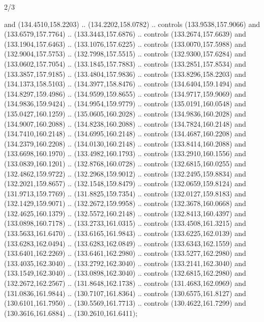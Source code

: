 \begin{flagdescription}{2/3}
\begin{scope}[shift={(0.5\flaglength,0.5)},scale=\flagwidth/320]
\begin{scope}[y=0.8pt, x=0.8pt, yscale=-1,shift={(-118.3,-146)}]
  and (134.4510,158.2203) .. (134.2202,158.0782) .. controls (133.9538,157.9066)
  and (133.6579,157.7764) .. (133.3443,157.6876) .. controls (133.2674,157.6639)
  and (133.1904,157.6463) .. (133.1076,157.6225) .. controls (133.0070,157.5988)
  and (132.9004,157.5753) .. (132.7998,157.5515) .. controls (132.9300,157.6284)
  and (133.0602,157.7054) .. (133.1845,157.7883) .. controls (133.2851,157.8534)
  and (133.3857,157.9185) .. (133.4804,157.9836) .. controls (133.8296,158.2203)
  and (134.1373,158.5103) .. (134.3977,158.8476) .. controls (134.6404,159.1494)
  and (134.8297,159.4986) .. (134.9599,159.8655) .. controls (134.9717,159.9069)
  and (134.9836,159.9424) .. (134.9954,159.9779) .. controls (135.0191,160.0548)
  and (135.0427,160.1259) .. (135.0605,160.2028) .. controls (134.9836,160.2028)
  and (134.9007,160.2088) .. (134.8238,160.2088) .. controls (134.7824,160.2148)
  and (134.7410,160.2148) .. (134.6995,160.2148) .. controls (134.4687,160.2208)
  and (134.2379,160.2208) .. (134.0130,160.2148) .. controls (133.8414,160.2088)
  and (133.6698,160.1970) .. (133.4982,160.1793) .. controls (133.2910,160.1556)
  and (133.0839,160.1201) .. (132.8768,160.0728) .. controls (132.6815,160.0255)
  and (132.4862,159.9722) .. (132.2968,159.9012) .. controls (132.2495,159.8834)
  and (132.2021,159.8657) .. (132.1548,159.8479) .. controls (132.0659,159.8124)
  and (131.9713,159.7769) .. (131.8825,159.7354) .. controls (132.0127,159.8183)
  and (132.1429,159.9071) .. (132.2672,159.9958) .. controls (132.3678,160.0668)
  and (132.4625,160.1379) .. (132.5572,160.2148) .. controls (132.8413,160.4397)
  and (133.0898,160.7178) .. (133.2733,161.0315) .. controls (133.4508,161.3215)
  and (133.5633,161.6470) .. (133.6165,161.9843) .. controls (133.6225,162.0139)
  and (133.6283,162.0494) .. (133.6283,162.0849) .. controls (133.6343,162.1559)
  and (133.6401,162.2269) .. (133.6461,162.2980) .. controls (133.5277,162.2980)
  and (133.4035,162.3040) .. (133.2792,162.3040) .. controls (133.2141,162.3040)
  and (133.1549,162.3040) .. (133.0898,162.3040) .. controls (132.6815,162.2980)
  and (132.2672,162.2567) .. (131.8648,162.1738) .. controls (131.4683,162.0969)
  and (131.0836,161.9844) .. (130.7107,161.8364) .. controls (130.6575,161.8127)
  and (130.6101,161.7950) .. (130.5569,161.7713) .. controls (130.4622,161.7299)
  and (130.3616,161.6884) .. (130.2610,161.6411);


\end{scope}
\end{scope}
\end{flagdescription}
